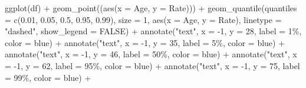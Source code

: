 \documentclass[
]{article}
\newenvironment{Shaded}{\begin{snugshade}}{\end{snugshade}}
\newcommand{\AttributeTok}[1]{\textcolor[rgb]{0.77,0.63,0.00}{#1}}
\newcommand{\ConstantTok}[1]{\textcolor[rgb]{0.00,0.00,0.00}{#1}}
\newcommand{\DecValTok}[1]{\textcolor[rgb]{0.00,0.00,0.81}{#1}}
\newcommand{\FloatTok}[1]{\textcolor[rgb]{0.00,0.00,0.81}{#1}}
\newcommand{\FunctionTok}[1]{\textcolor[rgb]{0.00,0.00,0.00}{#1}}
\newcommand{\NormalTok}[1]{#1}
\newcommand{\SpecialCharTok}[1]{\textcolor[rgb]{0.00,0.00,0.00}{#1}}
\newcommand{\StringTok}[1]{\textcolor[rgb]{0.31,0.60,0.02}{#1}}
\begin{document}
\begin{Shaded}
\begin{Highlighting}[]
\FunctionTok{ggplot}\NormalTok{(df) }\SpecialCharTok{+} 
    \FunctionTok{geom\_point}\NormalTok{((}\FunctionTok{aes}\NormalTok{(}\AttributeTok{x =}\NormalTok{ Age, }\AttributeTok{y =}\NormalTok{ Rate))) }\SpecialCharTok{+}
    \FunctionTok{geom\_quantile}\NormalTok{(}\AttributeTok{quantiles =} \FunctionTok{c}\NormalTok{(}\FloatTok{0.01}\NormalTok{, }\FloatTok{0.05}\NormalTok{, }\FloatTok{0.5}\NormalTok{, }\FloatTok{0.95}\NormalTok{, }\FloatTok{0.99}\NormalTok{), }
                  \AttributeTok{size =} \DecValTok{1}\NormalTok{, }
                  \FunctionTok{aes}\NormalTok{(}\AttributeTok{x =}\NormalTok{ Age, }\AttributeTok{y =}\NormalTok{ Rate),}
                  \AttributeTok{linetype =} \StringTok{"dashed"}\NormalTok{,}
                  \AttributeTok{show\_legend =} \ConstantTok{FALSE}\NormalTok{) }\SpecialCharTok{+}
    \FunctionTok{annotate}\NormalTok{(}\StringTok{"text"}\NormalTok{, }\AttributeTok{x =} \SpecialCharTok{{-}}\DecValTok{1}\NormalTok{, }\AttributeTok{y =} \DecValTok{28}\NormalTok{, }\AttributeTok{label =} \StringTok{\textquotesingle{}1\%\textquotesingle{}}\NormalTok{, }\AttributeTok{color =} \StringTok{\textquotesingle{}blue\textquotesingle{}}\NormalTok{) }\SpecialCharTok{+}
    \FunctionTok{annotate}\NormalTok{(}\StringTok{"text"}\NormalTok{, }\AttributeTok{x =} \SpecialCharTok{{-}}\DecValTok{1}\NormalTok{, }\AttributeTok{y =} \DecValTok{35}\NormalTok{, }\AttributeTok{label =} \StringTok{\textquotesingle{}5\%\textquotesingle{}}\NormalTok{, }\AttributeTok{color =} \StringTok{\textquotesingle{}blue\textquotesingle{}}\NormalTok{) }\SpecialCharTok{+}
    \FunctionTok{annotate}\NormalTok{(}\StringTok{"text"}\NormalTok{, }\AttributeTok{x =} \SpecialCharTok{{-}}\DecValTok{1}\NormalTok{, }\AttributeTok{y =} \DecValTok{46}\NormalTok{, }\AttributeTok{label =} \StringTok{\textquotesingle{}50\%\textquotesingle{}}\NormalTok{, }\AttributeTok{color =} \StringTok{\textquotesingle{}blue\textquotesingle{}}\NormalTok{) }\SpecialCharTok{+}
    \FunctionTok{annotate}\NormalTok{(}\StringTok{"text"}\NormalTok{, }\AttributeTok{x =} \SpecialCharTok{{-}}\DecValTok{1}\NormalTok{, }\AttributeTok{y =} \DecValTok{62}\NormalTok{, }\AttributeTok{label =} \StringTok{\textquotesingle{}95\%\textquotesingle{}}\NormalTok{, }\AttributeTok{color =} \StringTok{\textquotesingle{}blue\textquotesingle{}}\NormalTok{) }\SpecialCharTok{+}
    \FunctionTok{annotate}\NormalTok{(}\StringTok{"text"}\NormalTok{, }\AttributeTok{x =} \SpecialCharTok{{-}}\DecValTok{1}\NormalTok{, }\AttributeTok{y =} \DecValTok{75}\NormalTok{, }\AttributeTok{label =} \StringTok{\textquotesingle{}99\%\textquotesingle{}}\NormalTok{, }\AttributeTok{color =} \StringTok{\textquotesingle{}blue\textquotesingle{}}\NormalTok{) }\SpecialCharTok{+}

\end{Highlighting}
\end{Shaded}
\end{document}
